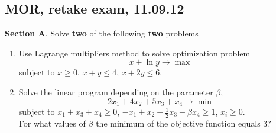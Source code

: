 \documentclass[12pt]{article} %
\theoremstyle{definition} %
\begin{document}

\subsection{MOR, retake exam, 11.09.12}


\textbf{Section A}. Solve \textbf{two} of the following \textbf{two} problems

\vspace{12pt}

\begin{enumerate}
\item Use Lagrange multipliers method to solve optimization problem
\[x+\ln y\to \max\]
subject to
$x\geq 0$, $x+y\leq 4$, $x+2y\leq 6$.
\item Solve the linear program depending on the parameter $\beta$,
\[2x_1+4x_2+5x_3+x_4\to\min\]
subject to $x_1+x_3+x_4\geq 0$, $-x_1+x_2+\frac{1}{2}x_3-\beta x_4\geq 1$, $x_i\geq 0$.\\
For what values of $\beta$ the minimum of the objective function equals 3?

\end{enumerate}
\end{document}
